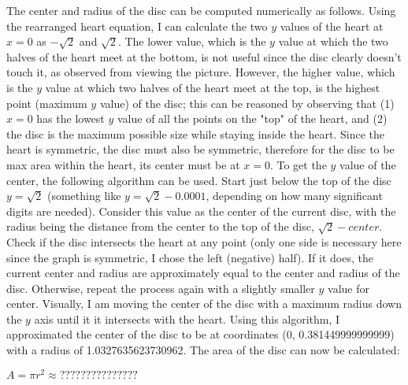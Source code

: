 \documentclass[12pt,letterpaper]{article}
\begin{document}
\begin{spacing}{1}
\begin{spacing}{1.2}
The center and radius of the disc can be computed numerically as follows. \newline
Using the rearranged heart equation, I can calculate the two $y$ values of the heart at $x=0$ as $-\sqrt{2}$ and $\sqrt{2}$. The lower value, which is the $y$ value at which the two halves of the heart meet at the bottom, is not useful since the disc clearly doesn't touch it, as observed from viewing the picture. However, the higher value, which is the $y$ value at which two halves of the heart meet at the top, is the highest point (maximum $y$ value) of the disc; this can be reasoned by observing that (1) $x=0$ has the lowest $y$ value of all the points on the "top" of the heart, and (2) the disc is the maximum possible size while staying inside the heart. Since the heart is symmetric, the disc must also be symmetric, therefore for the disc to be max area within the heart, its center must be at $x=0$. To get the $y$ value of the center, the following algorithm can be used.\newline
Start just below the top of the disc $y=\sqrt{2}$ (something like $y=\sqrt{2} - 0.0001$, depending on how many significant digits are needed). Consider this value as the center of the current disc, with the radius being the distance from the center to the top of the disc, $\sqrt{2} - center$. Check if the disc intersects the heart at any point (only one side is necessary here since the graph is symmetric, I chose the left (negative) half). If it does, the current center and radius are approximately equal to the center and radius of the disc. Otherwise, repeat the process again with a slightly smaller $y$ value for center. Visually, I am moving the center of the disc with a maximum radius down the $y$ axis until it it intersects with the heart. \newline
Using this algorithm, I approximated the center of the disc to be at coordinates (0, 0.381449999999999) with a radius of 1.0327635623730962. The area of the disc can now be calculated: \newline
\begin{mdframed}[backgroundcolor=gray!5]
$A = \pi r^2 \approx ???????????????$
\end{mdframed}

\end{spacing}
\end{spacing}
\end{document}
